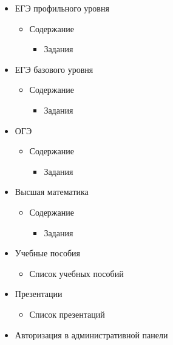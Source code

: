 \begin{itemize}
  \item ЕГЭ профильного уровня
    \begin{itemize}
      \item Содержание
      \begin{itemize}
        \item Задания
      \end{itemize}
    \end{itemize}

  \item ЕГЭ базового уровня
  \begin{itemize}
    \item Содержание
    \begin{itemize}
      \item Задания
    \end{itemize}
  \end{itemize}

  \item ОГЭ
  \begin{itemize}
    \item Содержание
    \begin{itemize}
      \item Задания
    \end{itemize}
  \end{itemize}

  \item Высшая математика
  \begin{itemize}
    \item Содержание
    \begin{itemize}
      \item Задания
    \end{itemize}
  \end{itemize}

  \item Учебные пособия
  \begin{itemize}
    \item Список учебных пособий
  \end{itemize}

  \item Презентации
  \begin{itemize}
    \item Список презентаций
  \end{itemize}

  \item Авторизация в административной панели
\end{itemize}

